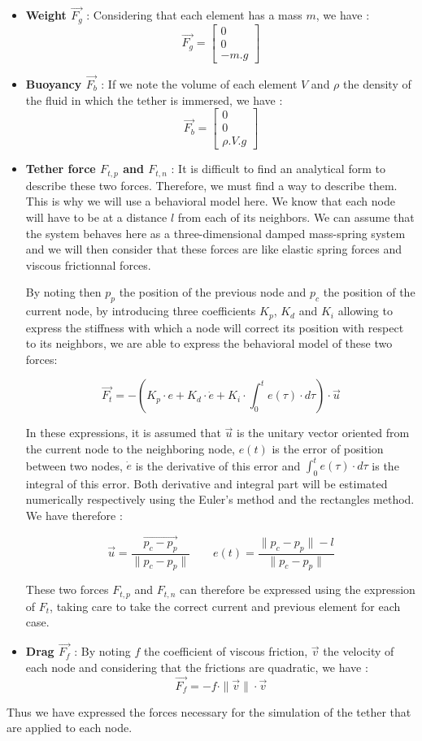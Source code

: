 \begin{itemize}
    \item \textbf{Weight $\overrightarrow{F_g}$} : Considering that each element has a mass $m$, we have : $$\overrightarrow{F_g} = \begin{bmatrix}0\\ 0\\ -m.g\end{bmatrix}$$
    \item \textbf{Buoyancy $\overrightarrow{F_b}$} : If we note the volume of each element $V$ and $\rho$ the density of the fluid in which the tether is immersed, we have : $$\overrightarrow{F_b} = \begin{bmatrix}0\\ 0\\ \rho.V.g\end{bmatrix}$$
    \item \textbf{Tether force $F_{t, p}$ and $F_{t, n}$} : It is difficult to find an analytical form to describe these two forces. Therefore, we must find a way to describe them. This is why we will use a behavioral model here. We know that each node will have to be at a distance $l$ from each of its neighbors. We can assume that the system behaves here as a three-dimensional damped mass-spring system and we will then consider that these forces are like elastic spring forces and viscous frictionnal forces.

    By noting then $p_{p}$ the position of the previous node and $p_{c}$ the position of the current node, by introducing three coefficients $K_p$, $K_d$ and $K_i$ allowing to express the stiffness with which a node will correct its position with respect to its neighbors, we are able to express the behavioral model of these two forces:
    
    $$\overrightarrow{F_{t}} = - \left(K_p \cdot e + K_d \cdot \dot e + K_i \cdot \int_{0}^te(\tau) \cdot d\tau \right) \cdot \overrightarrow{u}$$
    
    In these expressions, it is assumed that $\overrightarrow{u}$ is the unitary vector oriented from the current node to the neighboring node, $e(t)$ is the error of position between two nodes, $\dot e$ is the derivative of this error and $\int_{0}^te(\tau) \cdot d\tau$ is the integral of this error. Both derivative and integral part will be estimated numerically respectively using the Euler's method and the rectangles method. We have therefore :
    
    $$\overrightarrow{u} = \frac{\overrightarrow{p_c - p_p}}{\|p_c - p_p\|} \qquad e(t) = \frac{\|p_c - p_p\| - l}{\|p_c - p_p\|}$$
    
    These two forces $F_{t, p}$ and $F_{t, n}$ can therefore be expressed using the expression of $F_t$, taking care to take the correct current and previous element for each case.

    \item \textbf{Drag $\overrightarrow{F_f}$} : By noting $f$ the coefficient of viscous friction, $\overrightarrow{v}$ the velocity of each node and considering that the frictions are quadratic, we have : $$\overrightarrow{F_f} = -f \cdot \|\overrightarrow{v}\| \cdot \overrightarrow{v}$$
\end{itemize}

Thus we have expressed the forces necessary for the simulation of the tether that are applied to each node.